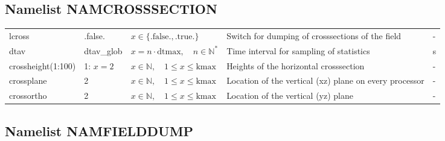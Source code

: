 \documentclass[twoside,11pt,fleqn,a4paper,english,openright]{report}
\begin{document}
\subsection{Namelist NAMCROSSSECTION}\label{par:crosssection}

\begin{center}
  \tablelasttail{
        &&&&\\\hline
  }
\begin{supertabular}{|l|p{1.6cm}|p{4cm}|p{6cm}|l|}
  lcross	& .false.	& $x\in\{\text{.false.},\text{.true.}\}$	& Switch for dumping of crosssections of the field	& -\\
  dtav		& dtav\_glob	& $x = n \cdot \text{dtmax}, \quad n \in \mathbb{N}^*$	& Time interval for sampling of statistics	& s\\
  crossheight(1:100)& 1: $x=2$ & $x \in \mathbb{N}, \quad 1 \leq x \leq \text{kmax}$	& Heights of the horizontal crosssection		& -\\
  crossplane	& 2		& $x \in \mathbb{N}, \quad 1 \leq x \leq \text{kmax}$	& Location of the vertical (xz) plane on every processor& -\\
  crossortho	& 2	& $x \in \mathbb{N}, \quad 1 \leq x \leq \text{kmax}$	& Location of the vertical (yz) plane & - \\
\end{supertabular}
\end{center}

\subsection{Namelist NAMFIELDDUMP}\label{par:fielddump}
\end{document}
